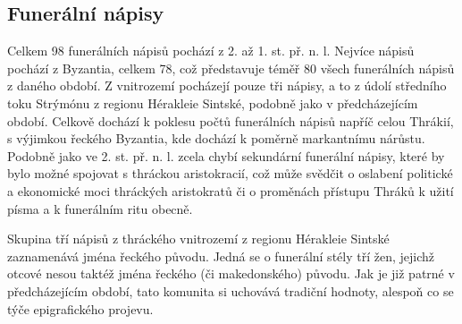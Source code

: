 
\subsection[funerální-nápisy-8]{Funerální nápisy}

Celkem 98 funerálních nápisů pochází z 2. až 1. st. př. n. l. Nejvíce nápisů pochází z Byzantia, celkem 78, což představuje téměř 80  všech funerálních nápisů z daného období. Z vnitrozemí pocházejí pouze tři nápisy, a to z údolí středního toku Strýmónu z regionu Hérakleie Sintské, podobně jako v předcházejícím období. Celkově dochází k poklesu počtů funerálních nápisů napříč celou Thrákií, s výjimkou řeckého Byzantia, kde dochází k poměrně markantnímu nárůstu. Podobně jako ve 2. st. př. n. l. zcela chybí sekundární funerální nápisy, které by bylo možné spojovat s thráckou aristokracií, což může svědčit o oslabení politické a ekonomické moci thráckých aristokratů či o proměnách přístupu Thráků k užití písma a k funerálním ritu obecně.

Skupina tří nápisů z thráckého vnitrozemí z regionu Hérakleie Sintské zaznamenává jména řeckého původu. Jedná se o funerální stély tří žen, jejichž otcové nesou taktéž jména řeckého (či makedonského) původu. Jak je již patrné v předcházejícím období, tato komunita si uchovává tradiční hodnoty, alespoň co se týče epigrafického projevu.

